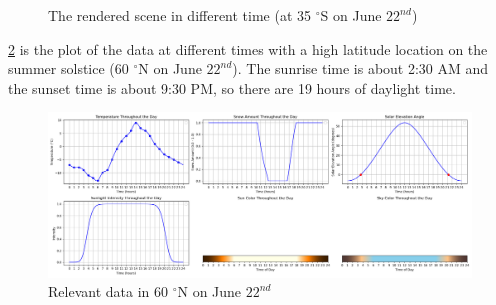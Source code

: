 \documentclass{article}
\begin{document}
\begin{figure}[h]

  \caption{The rendered scene in different time (at 35 $^{\circ}$S on June \(22^{nd}\))}
  \label{fig:AllL35S}
\end{figure}

\ref{fig:Plot60S} is the plot of the data at different times with a high latitude location on the summer solstice 
(60 $^{\circ}$N on June \(22^{nd}\)). The sunrise time is about 2:30 AM and the sunset time is about 9:30 PM, so 
there are 19 hours of daylight time.

\begin{figure}[h]
  \centering
  \begin{minipage}{1.00\textwidth}
      \centering
      \includegraphics[width=\textwidth]{images/Plot60S.png}
      \caption{Relevant data in 60 $^{\circ}$N on June \(22^{nd}\)}
      \label{fig:Plot60S}
  \end{minipage}
\end{figure}
\end{document}
